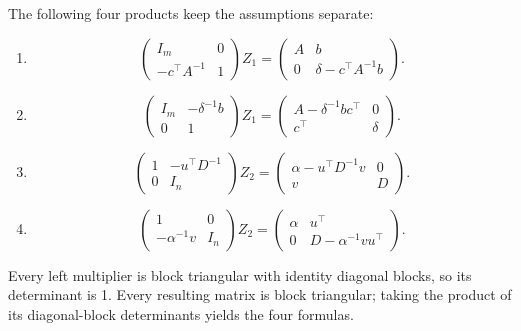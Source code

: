 \begin{solution}
The following four products keep the assumptions separate:
\begin{enumerate}
\item
\[
\begin{pmatrix}I_m&0\\-c^\top A^{-1}&1\end{pmatrix}Z_1
=\begin{pmatrix}A&b\\0&\delta-c^\top A^{-1}b\end{pmatrix}.
\]
\item
\[
\begin{pmatrix}I_m&-\delta^{-1}b\\0&1\end{pmatrix}Z_1
=\begin{pmatrix}A-\delta^{-1}bc^\top&0\\c^\top&\delta\end{pmatrix}.
\]
\item
\[
\begin{pmatrix}1&-u^\top D^{-1}\\0&I_n\end{pmatrix}Z_2
=\begin{pmatrix}\alpha-u^\top D^{-1}v&0\\v&D\end{pmatrix}.
\]
\item
\[
\begin{pmatrix}1&0\\-\alpha^{-1}v&I_n\end{pmatrix}Z_2
=\begin{pmatrix}\alpha&u^\top\\0&D-\alpha^{-1}vu^\top\end{pmatrix}.
\]
\end{enumerate}
Every left multiplier is block triangular with identity diagonal blocks,
so its determinant is 1. Every resulting matrix is block triangular;
taking the product of its diagonal-block determinants yields the four formulas.
\end{solution}

